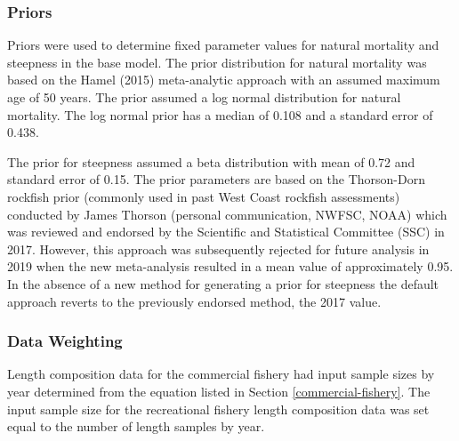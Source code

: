 \documentclass[11pt,
  english,
  a4paper,
]{article}
\begin{document}
\hypertarget{priors}{%
\subsubsection{Priors}\label{priors}}

\leavevmode\tagmcend\tagstructend


Priors were used to determine fixed parameter values for natural mortality and steepness in the base model. The prior distribution for natural mortality was based on the Hamel {(2015)\leavevmode\tagmcend\tagstructend} meta-analytic approach with an assumed maximum age of 50 years. The prior assumed a log normal distribution for natural mortality. The log normal prior has a median of 0.108 and a standard error of 0.438.

\leavevmode\tagmcend\tagstructend\par


The prior for steepness assumed a beta distribution with mean of 0.72 and standard error of 0.15. The prior parameters are based on the Thorson-Dorn rockfish prior (commonly used in past West Coast rockfish assessments) conducted by James Thorson (personal communication, NWFSC, NOAA) which was reviewed and endorsed by the Scientific and Statistical Committee (SSC) in 2017. However, this approach was subsequently rejected for future analysis in 2019 when the new meta-analysis resulted in a mean value of approximately 0.95. In the absence of a new method for generating a prior for steepness the default approach reverts to the previously endorsed method, the 2017 value.

\leavevmode\tagmcend\tagstructend\par


\hypertarget{data-weighting}{%
\subsubsection{Data Weighting}\label{data-weighting}}

\leavevmode\tagmcend\tagstructend


Length composition data for the commercial fishery had input sample sizes by year determined from the equation listed in Section \ref{commercial-fishery}. The input sample size for the recreational fishery length composition data was set equal to the number of length samples by year.
\end{document}
